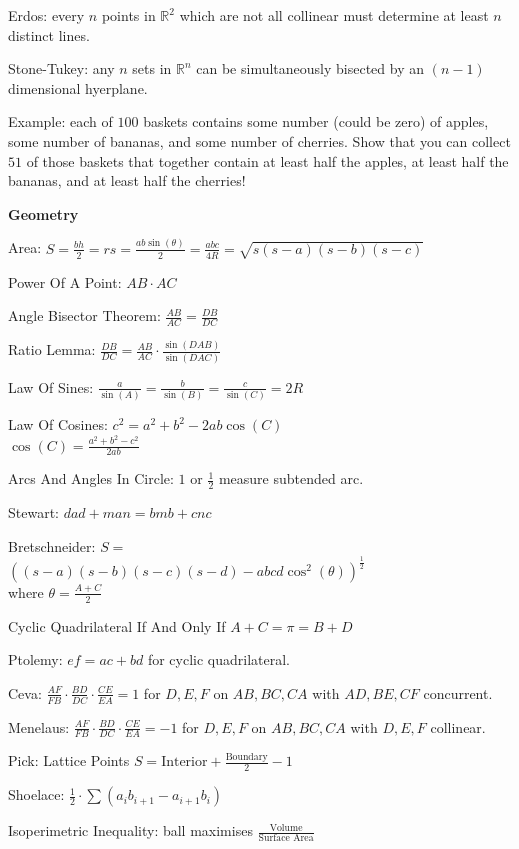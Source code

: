Erdos: every $n$ points in $\mathbb{R}^2$ which are not all collinear must determine at least $n$ distinct lines.

Stone-Tukey: any $n$ sets in $\mathbb{R}^n$ can be simultaneously bisected by an $(n-1)$ dimensional hyerplane.

Example: each of $100$ baskets contains some number (could be zero) of apples, some number of bananas, and some number of cherries. Show that you can collect $51$ of those baskets that together contain at least half the apples, at least half the bananas, and at least half the cherries!

\newpage

\textbf{Geometry}

Area: $S=\frac{bh}{2}=rs=\frac{ab\sin(\theta)}{2}=\frac{abc}{4R}=\sqrt{s(s-a)(s-b)(s-c)}$

Power Of A Point: $AB \cdot AC$

Angle Bisector Theorem: $\frac{AB}{AC}=\frac{DB}{DC}$

Ratio Lemma: $\frac{DB}{DC}=\frac{AB}{AC} \cdot \frac{\sin(DAB)}{\sin(DAC)}$

Law Of Sines: $\frac{a}{\sin(A)}=\frac{b}{\sin(B)}=\frac{c}{\sin(C)}=2R$

Law Of Cosines: $c^2=a^2+b^2-2ab\cos(C)$ \\
$\cos(C)=\frac{a^2+b^2-c^2}{2ab}$

Arcs And Angles In Circle: $1$ or $\frac{1}{2}$ measure subtended arc.

Stewart: $dad+man=bmb+cnc$

Bretschneider: $S=$ \\
$((s-a)(s-b)(s-c)(s-d)-abcd \cos^2 (\theta))^{\frac{1}{2}}$ \\
where $\theta = \frac{A+C}{2}$

Cyclic Quadrilateral If And Only If $A+C = \pi = B+D$

Ptolemy: $ef=ac+bd$ for cyclic quadrilateral.

Ceva: $\frac{AF}{FB} \cdot \frac{BD}{DC} \cdot \frac{CE}{EA} = 1$ for $D,E,F$ on $AB,BC,CA$ with $AD,BE,CF$ concurrent.

Menelaus: $\frac{AF}{FB} \cdot \frac{BD}{DC} \cdot \frac{CE}{EA} = -1$ for $D,E,F$ on $AB,BC,CA$ with $D,E,F$ collinear.

Pick: Lattice Points $S=\text{Interior}+\frac{\text{Boundary}}{2}-1$

Shoelace: $\frac{1}{2} \cdot \sum (a_i b_{i+1} - a_{i+1} b_i)$

Isoperimetric Inequality: ball maximises $\frac{\text{Volume}}{\text{Surface Area}}$

